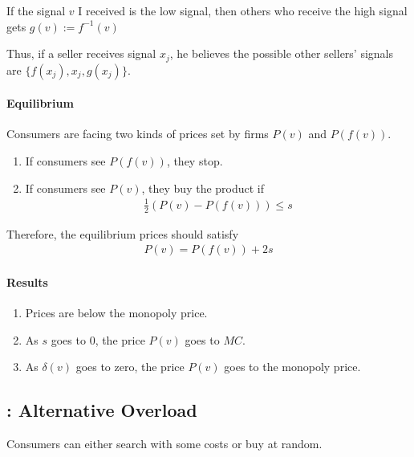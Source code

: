 \documentclass[11pt]{elegantbook}
\begin{document}
If the signal $v$ I received is the low signal, then others who receive the high signal gets $g(v):=f^{-1}(v)$

Thus, if a seller receives signal $x_j$, he believes the possible other sellers' signals are $\{f(x_j),x_j,g(x_j)\}$.

\paragraph*{Equilibrium}
Consumers are facing two kinds of prices set by firms $P(v)$ and $P(f(v))$.
\begin{enumerate}
    \item If consumers see $P(f(v))$, they stop.
    \item If consumers see $P(v)$, they buy the product if
    \begin{equation}
        \begin{aligned}
            \frac{1}{2}(P(v)-P(f(v)))\leq s
        \end{aligned}
        \nonumber
    \end{equation}
\end{enumerate}
Therefore, the equilibrium prices should satisfy
\begin{equation}
    \begin{aligned}
        P(v)=P(f(v))+2s
    \end{aligned}
    \nonumber
\end{equation}
\paragraph*{Results}
\begin{enumerate}
    \item Prices are below the monopoly price.
    \item As $s$ goes to $0$, the price $P(v)$ goes to $MC$.
    \item As $\delta(v)$ goes to zero, the price $P(v)$ goes to the monopoly price.
\end{enumerate}


\subsection{\cite{kuksov2010more}: Alternative Overload}
Consumers can either search with some costs or buy at random.
\end{document}
